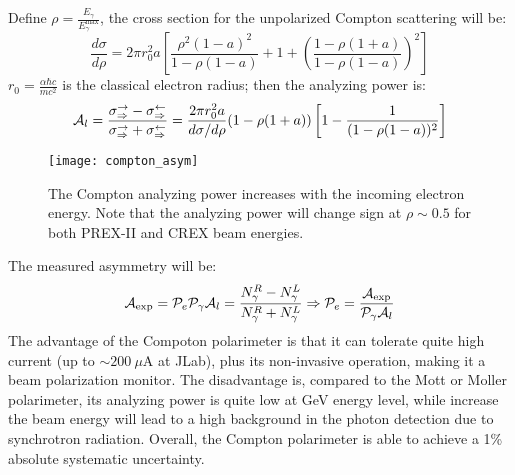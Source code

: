 Define $\rho = \frac{E_\gamma}{E_\gamma^{\text{max}}}$, the cross section for the unpolarized
Compton scattering will be:
\begin{equation}
    \frac{d\sigma}{d\rho} = 2\pi r_0^2 a 
    \left[ \frac{\rho^2 (1-a)^2}{1 - \rho(1-a)} + 1 + \left( \frac{1 - \rho(1+a)}{1- \rho(1-a)}\right)^2\right]
\end{equation}
$r_0 = \frac{\alpha \hbar c}{mc^2}$ is the classical electron radius; then the
analyzing power is:
\begin{equation}
    \mathcal{A}_l = \frac{\sigma^\rightarrow_\Rightarrow - \sigma^\leftarrow_\Rightarrow}
    {\sigma^\rightarrow_\Rightarrow + \sigma^\leftarrow_\Rightarrow}
    = \frac{2\pi r_0^2 a}{d\sigma/d\rho}(1 - \rho(1+a))\left[ 1 - \frac{1}{(1 - \rho(1-a))^2}\right]
\end{equation}
\begin{figure}
    \centering
    \texttt{[image: compton\_asym]}
    \caption{The Compton analyzing power increases with the incoming electron energy. 
    Note that the analyzing power will change sign at $\rho \sim 0.5$ for both PREX-II
    and CREX beam energies.}
\end{figure}

The measured asymmetry will be:
\begin{equation}
    \mathcal{A}_{\text{exp}} = \mathcal{P}_{e}\mathcal{P}_{\gamma}\mathcal{A}_{l} = \frac{N_{\gamma}^R - N_{\gamma}^L}{N_{\gamma}^R + N_{\gamma}^L}
    \Rightarrow
    \mathcal{P}_e = \frac{\mathcal{A}_{\text{exp}}}{\mathcal{P}_{\gamma}\mathcal{A}_{l}}
\end{equation}
The advantage of the Compoton polarimeter is that it can tolerate quite high current
(up to $\sim 200 \ \mu$A at JLab), plus its non-invasive operation, making it a beam 
polarization monitor. The disadvantage is, compared to the Mott or Moller polarimeter,
its analyzing power is quite low at GeV energy level, while increase the beam
energy will lead to a high background in the photon detection due to synchrotron 
radiation. Overall, the Compton polarimeter is able to achieve a 1\% absolute systematic
uncertainty.

